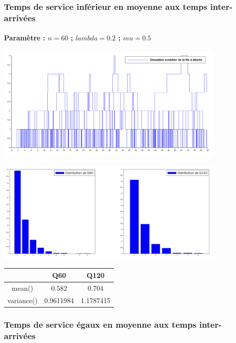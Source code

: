 \documentclass{article}
\begin{document}
\subsubsection{Temps de service inférieur en moyenne aux temps inter-arrivées}
\paragraph{Paramètre : $n=60$ ; $lambda=0.2$ ; $mu=0.5$}
\begin{center}
	\includegraphics[width=425px]{img/sup.PNG}
\end{center}
\begin{center}
	\includegraphics[width=425px]{img/inf/dist.png}
\end{center}
\begin{center}
	\begin{tabular}{c|cc}
		\hline \hline
		& Q60 & Q120 \\
		\hline
		mean() & 0.582 & 0.704 \\
		variance() & 0.9611984 & 1.1787415 \\
		\hline \hline
	\end{tabular}
\end{center}

\subsubsection{Temps de service égaux en moyenne aux temps inter-arrivées}
\end{document}
